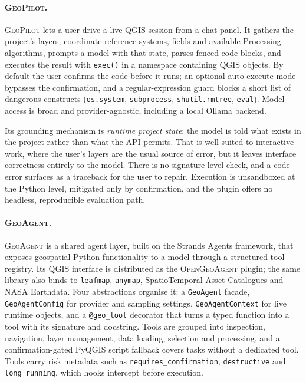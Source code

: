 \paragraph{\textsc{GeoPilot}.} \textsc{GeoPilot} \cite{geopilot} lets a user
drive a live QGIS session from a chat panel. It gathers the project's layers,
coordinate reference systems, fields and available Processing algorithms,
prompts a model with that state, parses fenced code blocks, and executes the
result with \texttt{exec()} in a namespace containing QGIS objects. By default
the user confirms the code before it runs; an optional auto-execute mode bypasses
the confirmation, and a regular-expression guard blocks a short list of dangerous
constructs (\texttt{os.system}, \texttt{subprocess}, \texttt{shutil.rmtree},
\texttt{eval}). Model access is broad and provider-agnostic, including a local
Ollama backend.

Its grounding mechanism is \emph{runtime project state}: the model is told what
exists in the project rather than what the API permits. That is well suited to
interactive work, where the user's layers are the usual source of error, but it
leaves interface correctness entirely to the model. There is no signature-level
check, and a code error surfaces as a traceback for the user to repair. Execution
is unsandboxed at the Python level, mitigated only by confirmation, and the
plugin offers no headless, reproducible evaluation path.

\paragraph{\textsc{GeoAgent}.} \textsc{GeoAgent} \cite{geoagent} is a shared
agent layer, built on the Strands Agents framework, that exposes geospatial
Python functionality to a model through a structured tool registry. Its QGIS
interface is distributed as the \textsc{OpenGeoAgent} plugin; the same library
also binds to \texttt{leafmap}, \texttt{anymap}, SpatioTemporal Asset
Catalogues and NASA Earthdata. Four abstractions organise it: a
\texttt{GeoAgent} facade, \texttt{GeoAgentConfig} for provider and sampling
settings, \texttt{GeoAgentContext} for live runtime objects, and a
\texttt{@geo\_tool} decorator that turns a typed function into a tool with its
signature and docstring. Tools are grouped into inspection, navigation, layer
management, data loading, selection and processing, and a confirmation-gated
PyQGIS script fallback covers tasks without a dedicated tool. Tools carry risk
metadata such as \texttt{requires\_confirmation}, \texttt{destructive} and
\texttt{long\_running}, which hooks intercept before execution.

